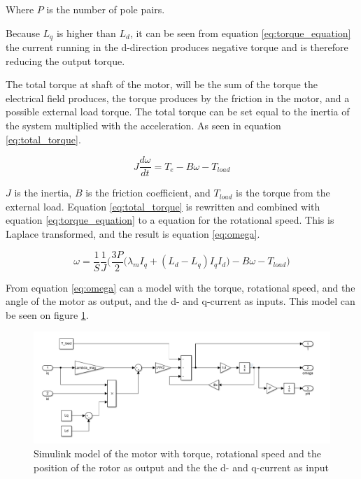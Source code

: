 Where $P$ is the number of pole pairs.

Because $L_q$ is higher than $L_d$, it can be seen from equation \ref{eq:torque_equation} the current running in the d-direction produces negative torque and is therefore reducing the output torque. 

The total torque at shaft of the motor, will be the sum of the torque the electrical field produces, the torque produces by the friction in the motor, and a possible external load torque. The total torque can be set equal to the inertia of the system multiplied with the acceleration. As seen in equation \ref{eq:total_torque}.

\begin{equation}
    \label{eq:total_torque}
    J\frac{d\omega}{dt} = T_e - B\omega - T_{load}
\end{equation}

$J$ is the inertia, $B$ is the friction coefficient, and $T_{load}$ is the torque from the external load.
Equation \ref{eq:total_torque} is rewritten and combined with equation \ref{eq:torque_equation} to a equation for the rotational speed. This is Laplace transformed, and the result is equation \ref{eq:omega}.

\begin{equation}
    \label{eq:omega}
    \omega = \frac{1}{S} \frac{1}{J} \bigg( \frac{3P}{2} \big( \lambda_m I_q + (L_d - L_q) I_q I_d \big) - B\omega - T_{load} \bigg)
\end{equation}

From equation \ref{eq:omega} can a model with the torque, rotational speed, and the angle of the motor as output, and the d- and q-current as inputs. This model can be seen on figure \ref{fig:torque}.

\begin{figure}[H]
	\centering
	\includegraphics[width=1\linewidth]{pictures/control/torque.PNG}
	\caption{Simulink model of the motor with torque, rotational speed and the position of the rotor as output and the the d- and q-current as input}
	\label{fig:torque}
\end{figure}

